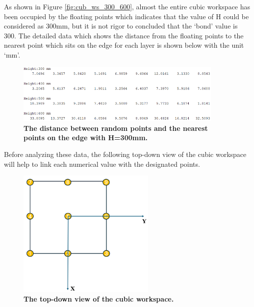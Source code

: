 \noindent As shown in Figure \ref{fig:cub_ws_300_600}, almost the entire cubic workspace has been occupied by the floating 
points which indicates that the value of H could be considered as 300mm, but it is not rigor to concluded that the 
‘bond’ value is 300. The detailed data which shows the distance from the floating points to the nearest point which 
sits on the edge for each layer is shown below with the unit ‘mm’.
\begin{figure}[H] %
    \centering %
    \captionsetup{labelsep=colon}
    \includegraphics[width=0.9\textwidth]{Image/Result/distance_1000000_300-600.png} 
    \caption[The distance between random points and the nearest points on the edge with H=300mm]
    {\centering \textbf{The distance between random points and the nearest points on the edge with H=300mm.}}
    \label{fig:data_300_600}
\end{figure}
\noindent Before analyzing these data, the following top-down view of the cubic workspace will help to link each 
numerical value with the designated points.
\begin{figure}[H] %
    \centering %
    \captionsetup{labelsep=colon}
    \includegraphics[width=0.6\textwidth]{Image/Result/top-down_view_rect_workspace.png} 
    \caption[The top-down view of the cubic workspace]
    {\centering \textbf{The top-down view of the cubic workspace.}}
    \label{fig:top_down_view}
\end{figure}
